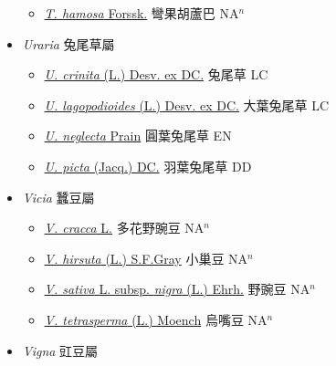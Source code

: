 \begin{itemize}
  \begin{itemize}
        \item[] \href{http://www.theplantlist.org/tpl1.1/search?q=Trigonella+hamosa}{\textit{T. hamosa} Forssk.}   彎果胡蘆巴 NA$^n$
  \end{itemize}
 \item[] \textit{Uraria} 兔尾草屬
                    
  \begin{itemize}
        \item[] \href{http://www.theplantlist.org/tpl1.1/search?q=Uraria+crinita}{\textit{U. crinita} (L.) Desv. ex DC.}   兔尾草 LC
        \item[] \href{http://www.theplantlist.org/tpl1.1/search?q=Uraria+lagopodioides}{\textit{U. lagopodioides} (L.) Desv. ex DC.}   大葉兔尾草 LC
        \item[] \href{http://www.theplantlist.org/tpl1.1/search?q=Uraria+neglecta}{\textit{U. neglecta} Prain}     圓葉兔尾草 EN
        \item[] \href{http://www.theplantlist.org/tpl1.1/search?q=Uraria+picta}{\textit{U. picta} (Jacq.) DC.}   羽葉兔尾草 DD
  \end{itemize}
 \item[] \textit{Vicia} 蠶豆屬
                    
  \begin{itemize}
        \item[] \href{http://www.theplantlist.org/tpl1.1/search?q=Vicia+cracca}{\textit{V. cracca} L.}   多花野豌豆 NA$^n$
        \item[] \href{http://www.theplantlist.org/tpl1.1/search?q=Vicia+hirsuta}{\textit{V. hirsuta} (L.) S.F.Gray}   小巢豆 NA$^n$
        \item[] \href{http://www.theplantlist.org/tpl1.1/search?q=Vicia+sativa+subsp.+nigra}{\textit{V. sativa} L. subsp. \textit{nigra} (L.) Ehrh.}   野豌豆 NA$^n$
        \item[] \href{http://www.theplantlist.org/tpl1.1/search?q=Vicia+tetrasperma}{\textit{V. tetrasperma} (L.) Moench}   烏嘴豆 NA$^n$
  \end{itemize}
 \item[] \textit{Vigna} 豇豆屬
                    

\end{itemize}
